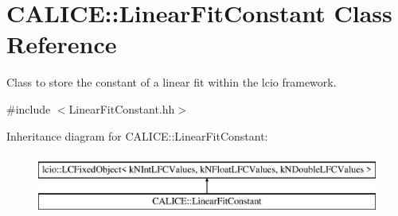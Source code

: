\section{C\-A\-L\-I\-C\-E\-:\-:Linear\-Fit\-Constant Class Reference}
\label{classCALICE_1_1LinearFitConstant}


Class to store the constant of a linear fit within the lcio framework.  




{\ttfamily \#include $<$Linear\-Fit\-Constant.\-hh$>$}

Inheritance diagram for C\-A\-L\-I\-C\-E\-:\-:Linear\-Fit\-Constant\-:\begin{figure}[H]
\begin{center}
\leavevmode
\includegraphics[height=2.000000cm]{classCALICE_1_1LinearFitConstant}
\end{center}
\end{figure}
